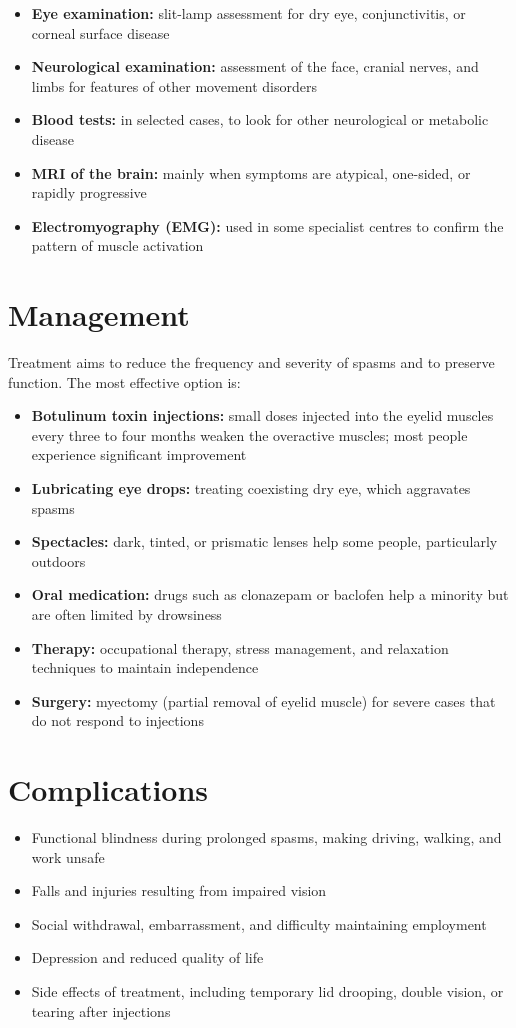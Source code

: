 \begin{itemize}
    \item \textbf{Eye examination:} slit-lamp assessment for dry eye, conjunctivitis, or corneal surface disease
    \item \textbf{Neurological examination:} assessment of the face, cranial nerves, and limbs for features of other movement disorders
    \item \textbf{Blood tests:} in selected cases, to look for other neurological or metabolic disease
    \item \textbf{MRI of the brain:} mainly when symptoms are atypical, one-sided, or rapidly progressive
    \item \textbf{Electromyography (EMG):} used in some specialist centres to confirm the pattern of muscle activation
\end{itemize}

\section*{Management}
Treatment aims to reduce the frequency and severity of spasms and to preserve function. The most effective option is:

\begin{itemize}
    \item \textbf{Botulinum toxin injections:} small doses injected into the eyelid muscles every three to four months weaken the overactive muscles; most people experience significant improvement
    \item \textbf{Lubricating eye drops:} treating coexisting dry eye, which aggravates spasms
    \item \textbf{Spectacles:} dark, tinted, or prismatic lenses help some people, particularly outdoors
    \item \textbf{Oral medication:} drugs such as clonazepam or baclofen help a minority but are often limited by drowsiness
    \item \textbf{Therapy:} occupational therapy, stress management, and relaxation techniques to maintain independence
    \item \textbf{Surgery:} myectomy (partial removal of eyelid muscle) for severe cases that do not respond to injections
\end{itemize}

\section*{Complications}
\begin{itemize}
    \item Functional blindness during prolonged spasms, making driving, walking, and work unsafe
    \item Falls and injuries resulting from impaired vision
    \item Social withdrawal, embarrassment, and difficulty maintaining employment
    \item Depression and reduced quality of life
    \item Side effects of treatment, including temporary lid drooping, double vision, or tearing after injections
\end{itemize}

